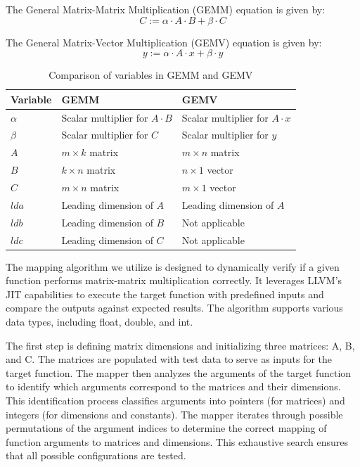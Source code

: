 \documentclass[manuscript,screen,review]{acmart}
\begin{document}
The General Matrix-Matrix Multiplication (GEMM) equation is given by:
\begin{equation}
	C := \alpha \cdot A \cdot B + \beta \cdot C
\end{equation}

The General Matrix-Vector Multiplication (GEMV) equation is given by:
\begin{equation}
	y := \alpha \cdot A \cdot x + \beta \cdot y
\end{equation}


\begin{table}[h!]
	\centering
	\begin{tabularx}{\textwidth}{|X|X|X|}
		\hline
		\textbf{Variable} & \textbf{GEMM} & \textbf{GEMV} \\
		\hline
		\(\alpha\) & Scalar multiplier for \(A \cdot B\) & Scalar multiplier for \(A \cdot x\) \\
		\hline
		\(\beta\) & Scalar multiplier for \(C\) & Scalar multiplier for \(y\) \\
		\hline
		\(A\) & \(m \times k\) matrix & \(m \times n\) matrix \\
		\hline
		\(B\) & \(k \times n\) matrix & \(n \times 1\) vector \\
		\hline
		\(C\) & \(m \times n\) matrix & \(m \times 1\) vector \\
		\hline
		\(lda\) & Leading dimension of \(A\) & Leading dimension of \(A\) \\
		\hline
		\(ldb\) & Leading dimension of \(B\) & Not applicable \\
		\hline
		\(ldc\) & Leading dimension of \(C\) & Not applicable \\
		\hline
	\end{tabularx}
	\caption{Comparison of variables in GEMM and GEMV}
	\label{variables}
\end{table}


The mapping algorithm we utilize is designed to dynamically verify if a given function performs matrix-matrix multiplication correctly. It leverages LLVM's JIT capabilities to execute the target function with predefined inputs and compare the outputs against expected results. The algorithm supports various data types, including float, double, and int.


The first step is defining matrix dimensions and initializing three matrices: A, B, and C. The matrices are populated with test data to serve as inputs for the target function. The mapper then analyzes the arguments of the target function to identify which arguments correspond to the matrices and their dimensions. This identification process classifies arguments into pointers (for matrices) and integers (for dimensions and constants).
The mapper iterates through possible permutations of the argument indices to determine the correct mapping of function arguments to matrices and dimensions. This exhaustive search ensures that all possible configurations are tested.
\end{document}
